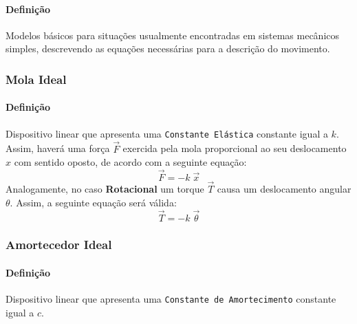 \documentclass{article}
\begin{document}
            \paragraph{Definição}Modelos básicos para situações usualmente encontradas em sistemas mecânicos simples, descrevendo as equações necessárias para a descrição do movimento.
                \begin{multicols}{2}
                    \raggedcolumns
                    \subsubsection{Mola Ideal}
                        \paragraph{Definição}Dispositivo linear que apresenta uma \texttt{Constante Elástica} constante igual a $k$.\\

                        Assim, haverá uma força $\vec{F}$ exercida pela mola proporcional ao seu deslocamento $x$ com sentido oposto, de acordo com a seguinte equação:
                            \begin{equation}
                                \boxed{
                                    \vec{F} = - k\;\vec{x}
                                }
                            \end{equation}
                        Analogamente, no caso \textbf{Rotacional} um torque $\vec{T}$ causa um deslocamento angular $\theta$. Assim, a seguinte equação será válida:
                            \begin{equation}
                                \boxed{
                                    \vec{T} = - k\;\vec{\theta}
                                }
                            \end{equation}

                    \columnbreak

                    \subsubsection{Amortecedor Ideal}
                        \paragraph{Definição}Dispositivo linear que apresenta uma \texttt{Constante de Amortecimento} constante igual a $c$.\\


\end{multicols}
\end{document}

